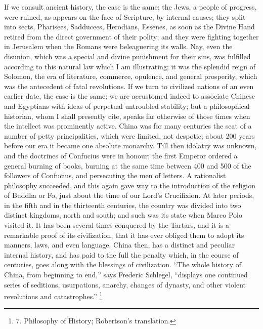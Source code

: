 If we consult ancient history,
the case is the same; the Jews, a people of progress, were ruined, as
appears on the face of Scripture, by internal causes; they split into
sects, Pharisees, Sadducees, Herodians, Essenes, as soon as the Divine
Hand retired from the direct government of their polity; and they were
fighting together in Jerusalem when the Romans were beleaguering its
walls. Nay, even the disunion, which was a special and divine
punishment for their sins, was fulfilled according to this natural law
which I am illustrating; it was the splendid reign of Solomon, the era
of literature, commerce, opulence, and general prosperity, which was
the antecedent of fatal revolutions. If we turn to civilized nations
of an even earlier date, the case is the same; we are accustomed
indeed to associate Chinese and Egyptians with ideas of perpetual
untroubled stability; but a philosophical historian, whom I shall
presently cite, speaks far otherwise of those times when the intellect
was prominently active. China was for many centuries the seat of a
number of petty principalities, which were limited, not despotic;
about 200 years before our era it became one absolute monarchy. Till
then idolatry was unknown, and the doctrines of Confucius were in
honour; the first Emperor ordered a general burning of books, burning
at the same time between 400 and 500 of the followers of
Confucius, and persecuting the men of letters. A rationalist
philosophy succeeded, and this again gave way to the introduction of
the religion of Buddha or Fo, just about the time of our Lord's
Crucifixion. At later periods, in the fifth and in the thirteenth
centuries, the country was divided into two distinct kingdoms, north
and south; and such was its state when Marco Polo visited it. It has
been several times conquered by the Tartars, and it is a remarkable
proof of its civilization, that it has ever obliged them to adopt its
manners, laws, and even language. China then, has a distinct and
peculiar internal history, and has paid to the full the penalty which,
in the course of centuries, goes along with the blessings of
civilization. ``The whole history of China, from beginning to end,''
says Frederic Schlegel, ``displays one continued series of seditions,
usurpations, anarchy, changes of dynasty, and other violent
revolutions and catastrophes.'' \footnote{7.
Philosophy of History; Robertson's translation.}

